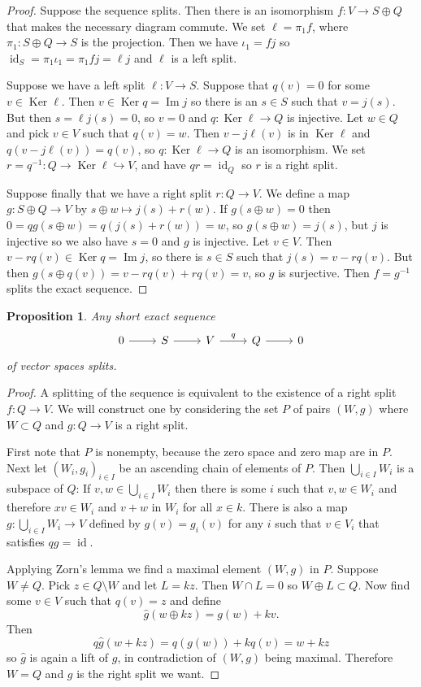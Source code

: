 \documentclass[11pt]{article}
\newtheorem{prop}[theo]{Proposition}
\theoremstyle{definition}
\DeclareMathOperator{\Ker}{Ker}
\DeclareMathOperator{\Img}{Im}
\DeclareMathOperator{\id}{id}
\begin{document}
\begin{proof}
Suppose the sequence splits.
Then there is an isomorphism $f : V \to S \oplus Q$ that makes the necessary diagram commute.
We set $\ell = \pi_1 f$, where $\pi_1 : S \oplus Q \to S$ is the projection.
Then we have $\iota_1 = fj$ so $\id_S = \pi_1 \iota_1 = \pi_1 f j = \ell j$ and $\ell$ is a left split.

Suppose we have a left split $\ell : V \to S$.
Suppose that $q(v) = 0$ for some $v \in \Ker \ell$.
Then $v \in \Ker q = \Img j$ so there is an $s \in S$ such that $v = j(s)$.
But then $s = \ell j(s) = 0$, so $v = 0$ and $q : \Ker \ell \to Q$ is injective.
Let $w \in Q$ and pick $v \in V$ such that $q(v) = w$.
Then $v - j \ell (v)$ is in $\Ker \ell$ and $q(v - j \ell (v)) = q(v)$, so $q : \Ker \ell \to Q$ is an isomorphism.
We set $r = q^{-1} : Q \to \Ker \ell \hookrightarrow V$, and have $qr = \id_Q$ so $r$ is a right split.

Suppose finally that we have a right split $r : Q \to V$.
We define a map $g : S \oplus Q \to V$ by $s \oplus w \mapsto j(s) + r(w)$.
If $g(s \oplus w) = 0$ then $0 = qg(s \oplus w) = q(j(s) + r(w)) = w$, so $g(s \oplus w) = j(s)$, but $j$ is injective so we also have $s = 0$ and $g$ is injective.
Let $v \in V$.
Then $v - rq(v) \in \Ker q = \Img j$, so there is $s \in S$ such that $j(s) = v - rq(v)$.
But then $g(s \oplus q(v)) = v - rq(v) + rq(v) = v$, so $g$ is surjective.
Then $f = g^{-1}$ splits the exact sequence.
\end{proof}




\begin{prop}
Any short exact sequence
\[
\begin{tikzcd}
0 \ar[r] &
S \ar[r] &
V \ar[r,"q"] &
Q \ar[r] &
0
\end{tikzcd}
\]
of vector spaces splits.
\end{prop}

\begin{proof}
A splitting of the sequence is equivalent to the existence of a right split $f : Q \to V$.
We will construct one by considering the set $P$ of pairs $(W, g)$ where $W \subset Q$ and $g : Q \to V$ is a right split.

First note that $P$ is nonempty, because the zero space and zero map are in $P$.
Next let $(W_i, g_i)_{i \in I}$ be an ascending chain of elements of $P$.
Then $\bigcup_{i \in I} W_i$ is a subspace of $Q$:
If $v,w \in \bigcup_{i \in I} W_i$ then there is some $i$ such that $v,w \in W_i$ and therefore $xv \in W_i$ and $v + w$ in $W_i$ for all $x \in k$.
There is also a map $g : \bigcup_{i \in I} W_i \to V$ defined by $g(v) = g_i(v)$ for any $i$ such that $v \in V_i$ that satisfies $qg = \id$.

Applying Zorn's lemma we find a maximal element $(W,g)$ in $P$.
Suppose $W \not= Q$.
Pick $z \in Q \setminus W$ and let $L = k z$.
Then $W \cap L = 0$ so $W \oplus L \subset Q$.
Now find some $v \in V$ such that $q(v) = z$ and define
\[
\hat g(w \oplus kz) = g(w) + k v.
\]
Then
\[
q \hat g(w + kz) 
= q(g(w)) + k q(v)
= w + kz
\]
so $\hat g$ is again a lift of $g$, in contradiction of $(W,g)$ being maximal.
Therefore $W = Q$ and $g$ is the right split we want.
\end{proof}
\end{document}
